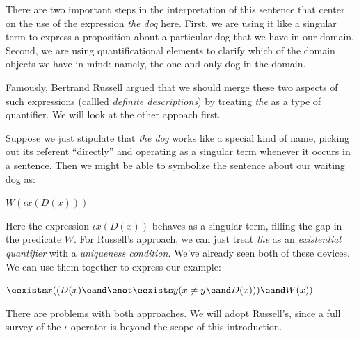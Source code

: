 There are two important steps in the interpretation of this sentence that center
on the use of the expression \emph{the dog} here. First, we are using it like a
singular term to express a proposition about a particular dog that we have in
our domain. Second, we are using quantificational elements to clarify which of
the domain objects we have in mind: namely, the one and only dog in the domain.

Famously, Bertrand Russell argued that we should merge these two aspects of such
expressions (callled \emph{definite descriptions}) by treating \emph{the} as a
type of quantifier. We will look at the other appoach first.

Suppose we just stipulate that \emph{the dog} works like a special kind of name,
picking out its referent ``directly'' and operating as a singular term whenever
it occurs in a sentence. Then we might be able to symbolize the sentence about
our waiting dog as:

\begin{argument}
\item[ ] $W(\iota x(D(x)))$
\end{argument}

Here the expression $\iota x(D(x))$ behaves as a singular term, filling the
gap in the predicate $W$. For Russell's approach, we can just treat \emph{the}
as an \emph{existential quantifier} with a \emph{uniqueness condition}. We've
already seen both of these devices. We can use them together to express our
example:

\begin{argument}
\item[ ] $\eexists x((D(x)\eand\enot\eexists y(x\neq y\eand D(x)))\eand W(x))$
\end{argument}

There are problems with both approaches. We will adopt Russell's, since a full
survey of the $\iota$ operator is beyond the scope of this introduction.

